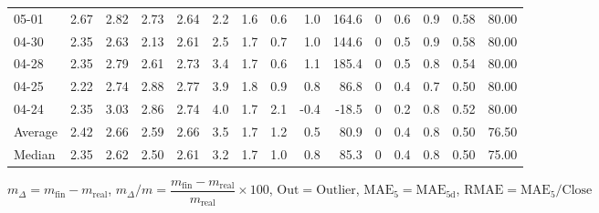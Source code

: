 \begin{threeparttable}
{\begin{tabular}{lrrrrrrrrrrrrrr}
  05-01 &          2.67 &          2.82 &          2.73 &        2.64 &                 2.2 &                1.6 &                 0.6 &        1.0 &        164.6 &              0 &                 0.6 &              0.9 &            0.58 &                  80.00 \\
  04-30 &          2.35 &          2.63 &          2.13 &        2.61 &                 2.5 &                1.7 &                 0.7 &        1.0 &        144.6 &              0 &                 0.5 &              0.9 &            0.58 &                  80.00 \\
  04-28 &          2.35 &          2.79 &          2.61 &        2.73 &                 3.4 &                1.7 &                 0.6 &        1.1 &        185.4 &              0 &                 0.5 &              0.8 &            0.54 &                  80.00 \\
  04-25 &          2.22 &          2.74 &          2.88 &        2.77 &                 3.9 &                1.8 &                 0.9 &        0.8 &         86.8 &              0 &                 0.4 &              0.7 &            0.50 &                  80.00 \\
  04-24 &          2.35 &          3.03 &          2.86 &        2.74 &                 4.0 &                1.7 &                 2.1 &       -0.4 &        -18.5 &              0 &                 0.2 &              0.8 &            0.52 &                  80.00 \\
Average &          2.42 &          2.66 &          2.59 &        2.66 &                 3.5 &                1.7 &                 1.2 &        0.5 &         80.9 &              0 &                 0.4 &              0.8 &            0.50 &                  76.50 \\
 Median &          2.35 &          2.62 &          2.50 &        2.61 &                 3.2 &                1.7 &                 1.0 &        0.8 &         85.3 &              0 &                 0.4 &              0.8 &            0.50 &                  75.00 \\
\bottomrule
\end{tabular}
}
\begin{tablenotes}\footnotesize
\item $m_\Delta=m_{\text{fin}}-m_{\text{real}}$,
$m_\Delta/m=\dfrac{m_{\text{fin}}-m_{\text{real}}}{m_{\text{real}}}\times100$,
$\mathrm{Out}=\text{Outlier}$,
$\mathrm{MAE}_5=\mathrm{MAE}_{5\text{d}}$,
$\mathrm{RMAE}=\mathrm{MAE}_5/\text{Close}$
\end{tablenotes}
\end{threeparttable}
\endgroup

